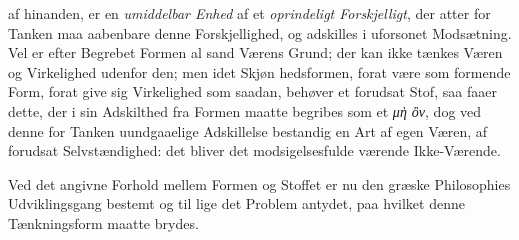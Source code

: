 \documentclass[12pt,a4paper]{book}
\newcommand{\gk}[1]{\textit{#1}}
\begin{document}
af hinanden, er en \emph{umiddelbar Enhed} af et \emph{oprindeligt
Forskjelligt}, der atter for Tanken maa aabenbare denne
Forskjellighed, og adskilles i uforsonet Modsætning. Vel er
efter Begrebet Formen al sand Værens Grund; der kan ikke
tænkes Væren og Virkelighed udenfor den; men idet Skjøn\-%
hedsformen, forat være som formende Form, forat give sig
Virkelighed som saadan, behøver et forudsat Stof, saa faaer
dette, der i sin Adskilthed fra Formen maatte begribes som
et \gk{μὴ ὂν}, dog ved denne for Tanken uundgaaelige Adskillelse
bestandig en Art af egen Væren, af forudsat Selvstændighed:
det bliver det modsigelsesfulde værende Ikke-Værende.

Ved det angivne Forhold mellem Formen og Stoffet er
nu den græske Philosophies Udviklingsgang bestemt og til\-%
lige det Problem antydet, paa hvilket denne Tænkningsform
maatte brydes.
\end{document}
